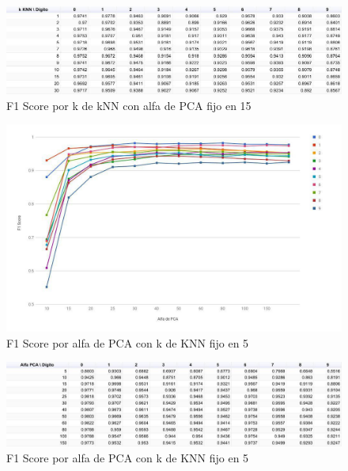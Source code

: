 \begin{figure}[H]
    \begin{center}
      \includegraphics[width=0.8\columnwidth]{imagenes/knn-f1-table.jpg}
      \caption{F1 Score por k de kNN con alfa de PCA fijo en 15}
    \end{center}
\end{figure}

\begin{figure}[H]
    \begin{center}
      \includegraphics[width=0.8\columnwidth]{imagenes/pca-f1.jpg}
      \caption{F1 Score por alfa de PCA con k de KNN fijo en 5}
    \end{center}
\end{figure}

\begin{figure}[H]
    \begin{center}
      \includegraphics[width=0.8\columnwidth]{imagenes/pca-f1-table.jpg}
      \caption{F1 Score por alfa de PCA con k de KNN fijo en 5}
    \end{center}
\end{figure}

